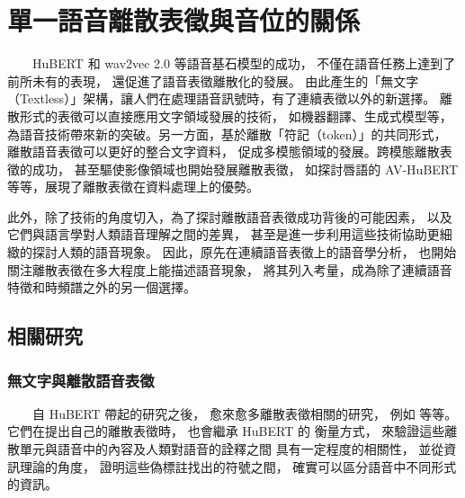 


\chapter{單一語音離散表徵與音位的關係}  %

　　HuBERT 和 wav2vec 2.0 等語音基石模型的成功，
不僅在語音任務上達到了前所未有的表現，
還促進了語音表徵離散化的發展。
由此產生的「無文字（Textless）」架構，讓人們在處理語音訊號時，有了連續表徵以外的新選擇。
離散形式的表徵可以直接應用文字領域發展的技術，
如機器翻譯、生成式模型等，為語音技術帶來新的突破。另一方面，基於離散「符記（token）」的共同形式，
離散語音表徵可以更好的整合文字資料，
促成多模態領域的發展。跨模態離散表徵的成功，
甚至驅使影像領域也開始發展離散表徵，  %
如探討唇語的 AV-HuBERT \cite{shi2021learning} 等等，展現了離散表徵在資料處理上的優勢。

此外，除了技術的角度切入，為了探討離散語音表徵成功背後的可能因素，
以及它們與語言學對人類語音理解之間的差異，
甚至是進一步利用這些技術協助更細緻的探討人類的語音現象。
因此，原先在連續語音表徵上的語音學分析，
也開始關注離散表徵在多大程度上能描述語音現象，
將其列入考量，成為除了連續語音特徵和時頻譜之外的另一個選擇。

\section{相關研究}

\subsection{無文字與離散語音表徵}

　　自 HuBERT 帶起的研究之後，
愈來愈多離散表徵相關的研究，
例如 \cite{10097097, abdullah23_interspeech, chang_exploration_2023, liu2024dinosr, zhang2024speechtokenizer, huang2023repcodec} 等等。
它們在提出自己的離散表徵時，
也會繼承 HuBERT 的
衡量方式，
來驗證這些離散單元與語音中的內容及人類對語音的詮釋之間
具有一定程度的相關性，
並從資訊理論的角度，
證明這些偽標註找出的符號之間，
確實可以區分語音中不同形式的資訊。

